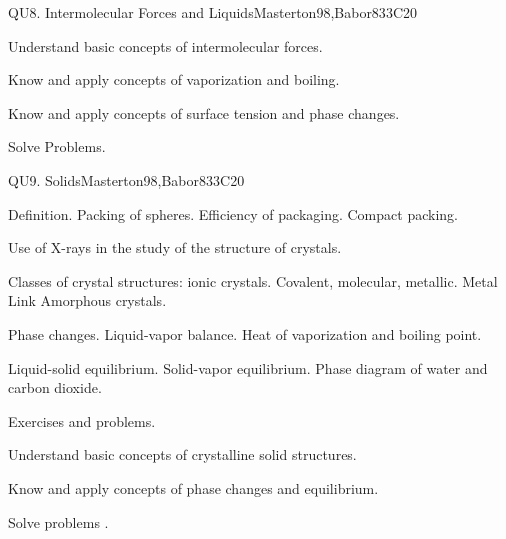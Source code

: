 \begin{syllabus}
\begin{unit}{QU8. Intermolecular Forces and Liquids}{}{Masterton98,Babor83}{3}{C20}
   \begin{learningoutcomes}
      \item Understand basic concepts of intermolecular forces.
      \item Know and apply concepts of vaporization and boiling.
      \item Know and apply concepts of surface tension and phase changes.
      \item Solve Problems.
   \end{learningoutcomes}
\end{unit}

\begin{unit}{QU9. Solids}{}{Masterton98,Babor83}{3}{C20}
\begin{topics}

      \item Definition. Packing of spheres. Efficiency of packaging. Compact packing.
      \item Use of X-rays in the study of the structure of crystals.
      \item Classes of crystal structures: ionic crystals. Covalent, molecular, metallic. Metal Link Amorphous crystals.
      \item Phase changes. Liquid-vapor balance. Heat of vaporization and boiling point.
      \item Liquid-solid equilibrium. Solid-vapor equilibrium. Phase diagram of water and carbon dioxide.
      \item Exercises and problems.
    \end{topics}

   \begin{learningoutcomes}
      \item Understand basic concepts of crystalline solid structures.
      \item Know and apply concepts of phase changes and equilibrium.
      \item Solve problems .
   \end{learningoutcomes}
\end{unit}


\end{syllabus}
